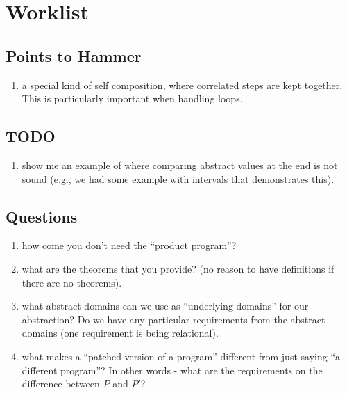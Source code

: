 \section{Worklist}

\subsection{Points to Hammer}

\begin{enumerate}
\item a special kind of self composition, where correlated steps are kept together. This is particularly important when handling loops. 
\end{enumerate}

\subsection{TODO}
\begin{enumerate}
\item show me an example of where comparing abstract values at the end is not sound (e.g., we had some example with intervals that demonstrates this). 
\end{enumerate}

   
\subsection{Questions}

\begin{enumerate}
\item how come you don't need the ``product program''? 
\item what are the theorems that you provide? (no reason to have definitions if there are no theorems).
\item what abstract domains can we use as ``underlying domains'' for our abstraction? Do we have any particular requirements from the abstract domains (one requirement is being relational). 
\item what makes a ``patched version of a program'' different from just saying ``a different program''? In other words - what are the requirements on the difference between $P$ and $P'$?
\end{enumerate}